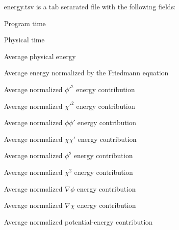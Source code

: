 energy.tsv is a tab serarated file with the following fields:

\begin{DoxyItemize}
\item Program time \item Physical time \item Average physical energy \item Average energy normalized by the Friedmann equation \item Average normalized $ \phi'^2 $ energy contribution \item Average normalized $ \chi'^2 $ energy contribution \item Average normalized $ \phi\phi' $ energy contribution \item Average normalized $ \chi\chi' $ energy contribution \item Average normalized $ \phi^2 $ energy contribution \item Average normalized $ \chi^2 $ energy contribution \item Average normalized $ \nabla \phi $ energy contribution \item Average normalized $ \nabla \chi $ energy contribution \item Average normalized potential-\/energy contribution \end{DoxyItemize}
